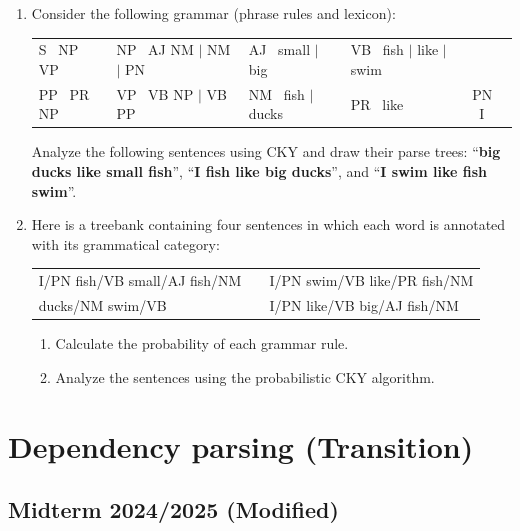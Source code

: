 \documentclass{../extra/aakpract/aakpract}
\begin{document}
	\begin{enumerate}
		
		\item Consider the following grammar (phrase rules and lexicon):
		
		\begin{tabular}{|lllll|}
			\hline
			S \textrightarrow\ NP VP & NP \textrightarrow\ AJ NM $|$ NM $|$ PN & AJ \textrightarrow\ small $|$ big  & VB \textrightarrow\ fish $|$ like $|$ swim &  \\
			PP \textrightarrow\ PR NP & VP \textrightarrow\ VB NP $|$ VB PP & NM \textrightarrow\ fish $|$ ducks & PR \textrightarrow\ like & PN \textrightarrow\ I \\
			\hline
		\end{tabular}
		
		Analyze the following sentences using CKY and draw their parse trees:
		``\textbf{big ducks like small fish}'', ``\textbf{I fish like big ducks}'', and ``\textbf{I swim like fish swim}''.
		
		\item Here is a treebank containing four sentences in which each word is annotated with its grammatical category:
		
		\begin{tabular}{|lll|}
			\hline
			I/PN fish/VB small/AJ fish/NM &&
			I/PN swim/VB like/PR fish/NM\\
			ducks/NM swim/VB &&
			I/PN like/VB big/AJ fish/NM \\
			\hline
		\end{tabular}
		
		\begin{enumerate}
			\item Calculate the probability of each grammar rule.
			\item Analyze the sentences using the probabilistic CKY algorithm.
		\end{enumerate}
		
	\end{enumerate}
	
	\section{Dependency parsing (Transition)} 
	
	\subsection{Midterm 2024/2025 (Modified)}
	
\end{document}
